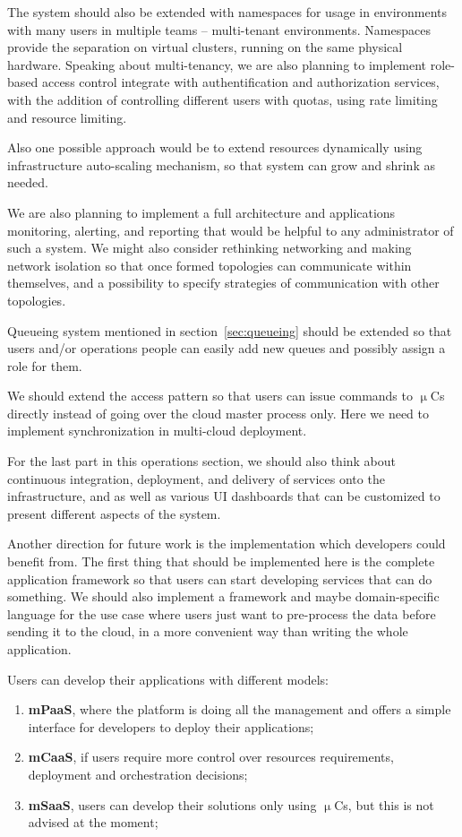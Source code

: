 The system should also be extended with namespaces for usage in environments with many users in multiple teams -- multi-tenant environments. Namespaces provide the separation on virtual clusters, running on the same physical hardware. Speaking about multi-tenancy, we are also planning to implement role-based access control integrate with authentification and authorization services, with the addition of controlling different users with quotas, using rate limiting and resource limiting.

Also one possible approach would be to extend resources dynamically using infrastructure auto-scaling mechanism, so that system can grow and shrink as needed.

We are also planning to implement a full architecture and applications monitoring, alerting, and reporting that would be helpful to any administrator of such a system. We might also consider rethinking networking and making network isolation so that once formed topologies can communicate within themselves, and a possibility to specify 
strategies of communication with other topologies.

Queueing system mentioned in section~\ref{sec:queueing} should be extended so that users and/or operations people can easily add new queues and possibly assign a role for them.

We should extend the access pattern so that users can issue commands to $\upmu$Cs directly instead of going over the cloud master process only. Here we need to implement synchronization in multi-cloud deployment.

For the last part in this operations section, we should also think about continuous integration, deployment, and delivery of services onto the infrastructure, and as well as various UI dashboards that can be customized to present different aspects of the system.

Another direction for future work is the implementation which developers could benefit from. The first thing that should be implemented here is the complete application framework so that users can start developing services that can do something. We should also implement a framework and maybe domain-specific language for the use case where users just want to pre-process the data before sending it to the cloud, in a more convenient way than writing the whole application.

Users can develop their applications with different models: 

\begin{enumerate}[start=1,label={(\bfseries \arabic*)}]
	\item \textbf{mPaaS}, where the platform is doing all the management and offers a simple interface for developers to deploy their applications;
	\item \textbf{mCaaS}, if users require more control over resources requirements, deployment and orchestration decisions;
	\item \textbf{mSaaS}, users can develop their solutions only using $\upmu$Cs, but this is not advised at the moment;
\end{enumerate}

